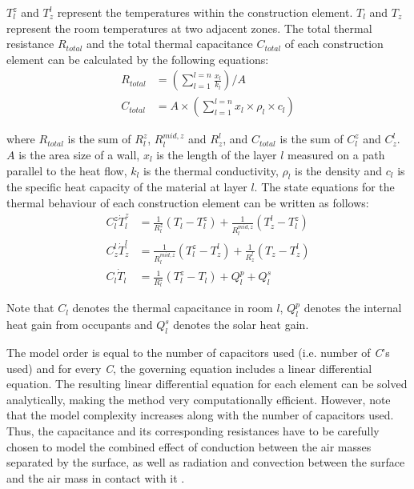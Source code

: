 $T_l^z$ and $T_z^l$ represent the temperatures within the construction element. $T_l$ and $T_z$ represent the room temperatures at two adjacent zones. The total thermal resistance $R_{total}$ and the total thermal capacitance $C_{total}$ of each construction element can be calculated by the following equations:
\begingroup
\begin{align*}
R_{total} &= \left(\sum_{l=1}^{l=n} \frac{x_l}{k_l} \right) / A \\
C_{total} &= A \times \left( \sum_{l=1}^{l=n} x_l \times \rho_l \times c_l \right)
\end{align*}
\endgroup

\noindent where $R_{total}$ is the sum of $R^z_l$, $R^{mid,z}_l$ and $R^l_z$, and $C_{total}$ is the sum of $C^z_l$ and $C^l_z$. $A$ is the area size of a wall, $x_l$ is the length of the layer $l$ measured on a path parallel to the heat flow, $k_l$ is the thermal conductivity, $\rho_l$ is the density and $c_l$ is the specific heat capacity of the material at layer $l$.
The state equations for the thermal behaviour of each construction element can be written as follows:
\begingroup
\begin{align*}
C_l^z \dot{T}_l^z &= \frac{1}{R_l^z}\left(T_l-T_l^z\right) + \frac{1}{R_l^{mid,z}}\left(T_z^l-T_l^z\right) \\
C_z^l \dot{T}_z^l &= \frac{1}{R_l^{mid,z}}\left(T_l^z-T_z^l\right) + \frac{1}{R_z^l}\left(T_z-T_z^l\right) \\
C_l \dot{T}_l &= \frac{1}{R_l^z}\left(T_l^z-T_l\right) + Q^p_l + Q^s_l
\end{align*}
\endgroup

Note that $C_l$ denotes the thermal capacitance in room $l$, $Q^p_l$ denotes the internal heat gain from occupants and $Q^s_l$ denotes the solar heat gain.

The model order is equal to the number of capacitors used (i.e. number of \textsl{C}'s used) and for every \textsl{C}, the governing equation includes a linear differential equation. 
The resulting linear differential equation for each element can be solved analytically, making the method very computationally efficient. However, note that the model complexity increases along with the number of capacitors used. 
Thus, the capacitance and its corresponding resistances have to be carefully chosen to model the combined effect of conduction between the air masses separated by the surface, as well as radiation and convection between the surface and the air mass in contact with it \citep{goyal2012method}. 

